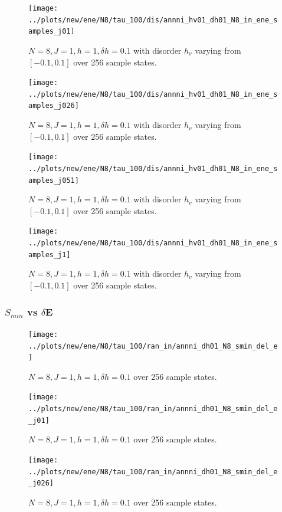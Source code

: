 \documentclass[a4paper]{article}
\begin{document}
\begin{figure}[h!]
  \centering
  \texttt{[image: ../plots/new/ene/N8/tau\_100/dis/annni\_hv01\_dh01\_N8\_in\_ene\_samples\_j01]}
  \caption{$N = 8, J = 1, h = 1, \delta h=0.1$ with disorder $h_v$ varying from $[-0.1,0.1]$ over 256 sample states.}
  \label{fig:}
\end{figure}

\begin{figure}[h!]
  \centering
  \texttt{[image: ../plots/new/ene/N8/tau\_100/dis/annni\_hv01\_dh01\_N8\_in\_ene\_samples\_j026]}
  \caption{$N = 8, J = 1, h = 1, \delta h=0.1$ with disorder $h_v$ varying from $[-0.1,0.1]$ over 256 sample states.}
  \label{fig:}
\end{figure}

\begin{figure}[h!]
  \centering
  \texttt{[image: ../plots/new/ene/N8/tau\_100/dis/annni\_hv01\_dh01\_N8\_in\_ene\_samples\_j051]}
  \caption{$N = 8, J = 1, h = 1, \delta h=0.1$ with disorder $h_v$ varying from $[-0.1,0.1]$ over 256 sample states.}
  \label{fig:}
\end{figure}

\begin{figure}[h!]
  \centering
  \texttt{[image: ../plots/new/ene/N8/tau\_100/dis/annni\_hv01\_dh01\_N8\_in\_ene\_samples\_j1]}
  \caption{$N = 8, J = 1, h = 1, \delta h=0.1$ with disorder $h_v$ varying from $[-0.1,0.1]$ over 256 sample states.}
  \label{fig:}
\end{figure}


\clearpage
\subsubsection{$S_{min}$ vs $\delta$E}
\begin{figure}[h!]
  \centering
  \texttt{[image: ../plots/new/ene/N8/tau\_100/ran\_in/annni\_dh01\_N8\_smin\_del\_e]}
  \caption{$N = 8, J = 1, h = 1, \delta h=0.1$ over 256 sample states.}
  \label{fig:}
\end{figure}

\begin{figure}[h!]
  \centering
  \texttt{[image: ../plots/new/ene/N8/tau\_100/ran\_in/annni\_dh01\_N8\_smin\_del\_e\_j01]}
  \caption{$N = 8, J = 1, h = 1, \delta h=0.1$ over 256 sample states.}
  \label{fig:}
\end{figure}

\begin{figure}[h!]
  \centering
  \texttt{[image: ../plots/new/ene/N8/tau\_100/ran\_in/annni\_dh01\_N8\_smin\_del\_e\_j026]}
  \caption{$N = 8, J = 1, h = 1, \delta h=0.1$ over 256 sample states.}
  \label{fig:}
\end{figure}
\end{document}
